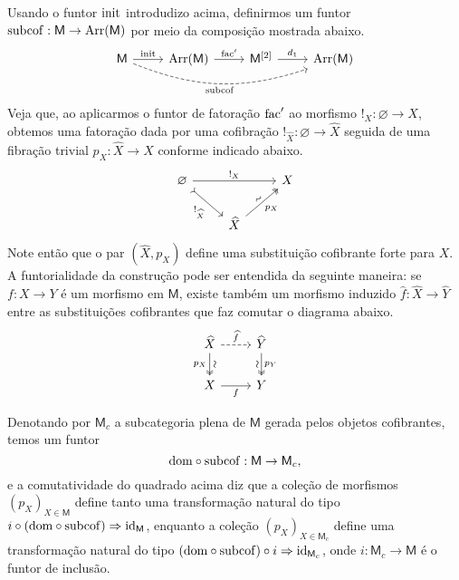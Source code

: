 \begin{obs}
  Usando o funtor $\mathrm{init}$ introdudizo acima, definirmos um funtor $\mathrm{subcof}: \mathsf{M} \to \mathrm{Arr}(\mathsf{M})$ por meio da composição mostrada abaixo.
  \begin{displaymath}
    \begin{tikzcd}
      \mathsf{M}
      \arrow[r, "\init"]
      \arrow[rrr, dashed, bend right=20, "\mathrm{subcof}" swap]
      & \Arr(\mathsf{M})
      \arrow[r, "\fac'"]
      & \mathsf{M}^{[2]}
      \arrow[r, "d_{1}"]
      & \Arr(\mathsf{M})
    \end{tikzcd}
  \end{displaymath}
  Veja que, ao aplicarmos o funtor de fatoração $\mathrm{fac}'$ ao morfismo $!_{X}: \varnothing \to X$, obtemos uma fatoração dada por uma cofibração $!_{\widehat{X}}: \varnothing \to \widehat{X}$ seguida de uma fibração trivial $p_{X}: \widehat{X} \to X$ conforme indicado abaixo.
  \begin{displaymath}
    \begin{tikzcd}
      \varnothing
      \arrow[rr, "!_{X}"]
      \arrow[rd, tail, "!_{\widehat{X}}" swap]
      & & X
      \\ & \widehat{X}
      \arrow[ru, two heads, "p_{X}" {swap}, "\sim" {sloped}]
    \end{tikzcd}
  \end{displaymath}
  Note então que o par $(\widehat{X},p_{X})$ define uma substituição cofibrante forte para $X$.
  A funtorialidade da construção pode ser entendida da seguinte maneira: se $f: X \to Y$ é um morfismo em $\mathsf{M}$, existe também um morfismo induzido $\widehat{f}: \widehat{X} \to \widehat{Y}$ entre as substituições cofibrantes que faz comutar o diagrama abaixo.
  \begin{equation}\label{eq:funtorialidade_substituicao_cofibrante}
    \begin{tikzcd}
      \widehat{X}
      \arrow[r, dashed, "\widehat{f}"]
      \arrow[d, two heads, "p_{X}" {swap}, "\sim" {sloped}]
      & \widehat{Y}
      \arrow[d, two heads, "p_{Y}", "\sim" {swap,sloped}]
      \\ X
      \arrow[r, "f" swap]
      & Y
    \end{tikzcd}
  \end{equation}

  Denotando por $\mathsf{M}_{c}$ a subcategoria plena de $\mathsf{M}$ gerada pelos objetos cofibrantes, temos um funtor
  \begin{displaymath}
    \mathrm{dom} \circ \mathrm{subcof}: \mathsf{M} \to \mathsf{M}_{c},
  \end{displaymath}
  e a comutatividade do quadrado acima diz que a coleção de morfismos $(p_{X})_{X \in \mathsf{M}}$ define tanto uma transformação natural do tipo $i \circ (\mathrm{dom} \circ \mathrm{subcof}) \Rightarrow \mathrm{id}_{\mathsf{M}}$, enquanto a coleção $(p_{X})_{X \in \mathsf{M}_{c}}$ define uma transformação natural do tipo $(\mathrm{dom} \circ \mathrm{subcof}) \circ i \Rightarrow \mathrm{id}_{\mathsf{M}_{c}}$, onde $i: \mathsf{M}_{c} \to \mathsf{M}$ é o funtor de inclusão.


\end{obs}

